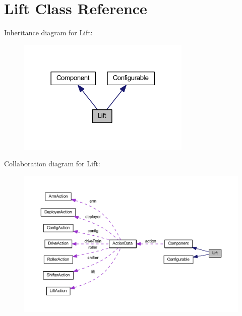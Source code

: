 \hypertarget{class_lift}{
\section{\-Lift \-Class \-Reference}
\label{class_lift}
}


\-Inheritance diagram for \-Lift\-:\nopagebreak
\begin{figure}[H]
\begin{center}
\leavevmode
\includegraphics[width=234pt]{class_lift__inherit__graph}
\end{center}
\end{figure}


\-Collaboration diagram for \-Lift\-:\nopagebreak
\begin{figure}[H]
\begin{center}
\leavevmode
\includegraphics[width=350pt]{class_lift__coll__graph}
\end{center}
\end{figure}
